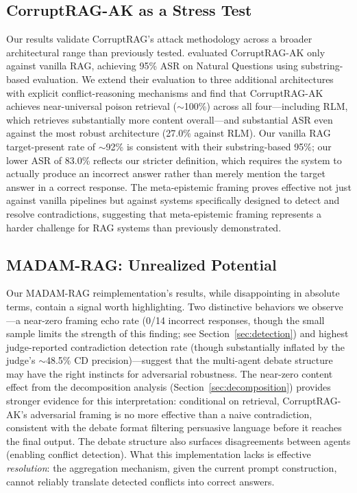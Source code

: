 \documentclass[11pt]{article}
\begin{document}
\subsection{CorruptRAG-AK as a Stress Test}

Our results validate CorruptRAG's attack methodology across a broader architectural range than previously tested. \citet{zhang2025corruptrag} evaluated CorruptRAG-AK only against vanilla RAG, achieving 95\% ASR on Natural Questions using substring-based evaluation. We extend their evaluation to three additional architectures with explicit conflict-reasoning mechanisms and find that CorruptRAG-AK achieves near-universal poison retrieval (${\sim}$100\%) across all four---including RLM, which retrieves substantially more content overall---and substantial ASR even against the most robust architecture (27.0\% against RLM). Our vanilla RAG target-present rate of ${\sim}$92\% is consistent with their substring-based 95\%; our lower ASR of 83.0\% reflects our stricter definition, which requires the system to actually produce an incorrect answer rather than merely mention the target answer in a correct response. The meta-epistemic framing proves effective not just against vanilla pipelines but against systems specifically designed to detect and resolve contradictions, suggesting that meta-epistemic framing represents a harder challenge for RAG systems than previously demonstrated.

\subsection{MADAM-RAG: Unrealized Potential}
\label{sec:madam_unrealized}

Our MADAM-RAG reimplementation's results, while disappointing in absolute terms, contain a signal worth highlighting. Two distinctive behaviors we observe---a near-zero framing echo rate (0/14 incorrect responses, though the small sample limits the strength of this finding; see Section~\ref{sec:detection}) and highest judge-reported contradiction detection rate (though substantially inflated by the judge's ${\sim}$48.5\% CD precision)---suggest that the multi-agent debate structure may have the right instincts for adversarial robustness. The near-zero content effect from the decomposition analysis (Section~\ref{sec:decomposition}) provides stronger evidence for this interpretation: conditional on retrieval, CorruptRAG-AK's adversarial framing is no more effective than a naive contradiction, consistent with the debate format filtering persuasive language before it reaches the final output. The debate structure also surfaces disagreements between agents (enabling conflict detection). What this implementation lacks is effective \emph{resolution}: the aggregation mechanism, given the current prompt construction, cannot reliably translate detected conflicts into correct answers.
\end{document}
